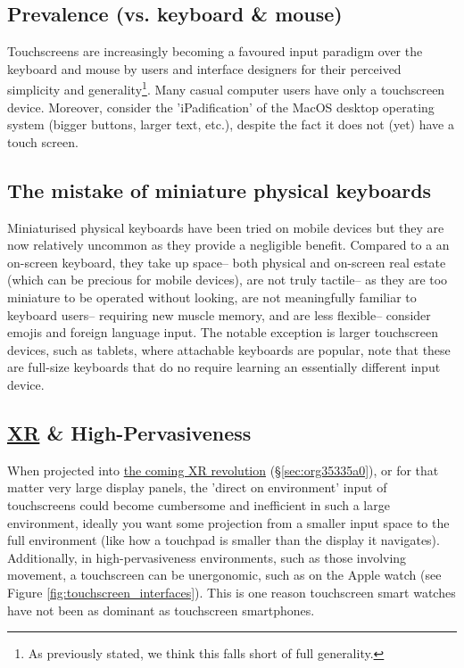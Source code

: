 \documentclass[logo,bsc,singlespacing,parskip]{infthesis}
\begin{document}
\subsection{Prevalence (vs. keyboard \& mouse)}
\label{sec:org6eb77ec}
Touchscreens are increasingly becoming a favoured input paradigm over the keyboard and mouse by users and interface designers for their perceived simplicity and generality\footnote{As previously stated, we think this falls short of full generality.}.
Many casual computer users have only a touchscreen device.
Moreover, consider the 'iPadification' of the MacOS desktop operating system (bigger buttons, larger text, etc.), despite the fact it does not (yet) have a touch screen.

\subsection{The mistake of miniature physical keyboards}
\label{sec:orged6f420}
Miniaturised physical keyboards have been tried on mobile devices but they are now relatively uncommon as they provide a negligible benefit.
Compared to a an on-screen keyboard, they take up space-- both physical and on-screen real estate (which can be precious for mobile devices), are not truly tactile-- as they are too miniature to be operated without looking, are not meaningfully familiar to keyboard users-- requiring new muscle memory, and are less flexible-- consider emojis and foreign language input.
The notable exception is larger touchscreen devices, such as tablets, where attachable keyboards are popular, note that these are full-size keyboards that do no require learning an essentially different input device.

\subsection{\hyperref[org53dbe83]{XR} \& High-Pervasiveness}
\label{sec:org8d17452}
When projected into \hyperref[sec:org35335a0]{the coming XR revolution} (\S \ref{sec:org35335a0}), or for that matter very large display panels, the 'direct on environment' input of touchscreens could become cumbersome and inefficient in such a large environment, ideally you want some projection from a smaller input space to the full environment (like how a touchpad is smaller than the display it navigates).
Additionally, in high-pervasiveness environments, such as those involving movement, a touchscreen can be unergonomic, such as on the Apple watch (see Figure \ref{fig:touchscreen_interfaces}).
This is one reason touchscreen smart watches have not been as dominant as touchscreen smartphones.
\end{document}
